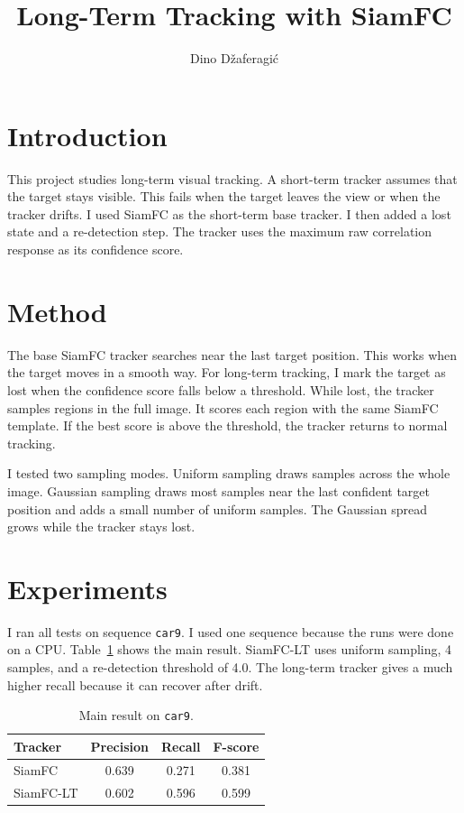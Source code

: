\documentclass[9pt]{IEEEtran}
\title{\vspace{0ex}
Long-Term Tracking with SiamFC}
\author{Dino Džaferagić\vspace{-4.0ex}}
\begin{document}
\maketitle

\section{Introduction}

This project studies long-term visual tracking. A short-term tracker assumes that the target stays visible. This fails when the target leaves the view or when the tracker drifts. I used SiamFC as the short-term base tracker. I then added a lost state and a re-detection step. The tracker uses the maximum raw correlation response as its confidence score.

\section{Method}

The base SiamFC tracker searches near the last target position. This works when the target moves in a smooth way. For long-term tracking, I mark the target as lost when the confidence score falls below a threshold. While lost, the tracker samples regions in the full image. It scores each region with the same SiamFC template. If the best score is above the threshold, the tracker returns to normal tracking.

I tested two sampling modes. Uniform sampling draws samples across the whole image. Gaussian sampling draws most samples near the last confident target position and adds a small number of uniform samples. The Gaussian spread grows while the tracker stays lost.

\section{Experiments}

I ran all tests on sequence \texttt{car9}. I used one sequence because the runs were done on a CPU. Table~\ref{tab:main} shows the main result. SiamFC-LT uses uniform sampling, 4 samples, and a re-detection threshold of 4.0. The long-term tracker gives a much higher recall because it can recover after drift.

\begin{table}[h]
    \centering
    \caption{Main result on \texttt{car9}.}
    \label{tab:main}
    \scriptsize
    \begin{tabular}{lccc}
        \hline
        Tracker   & Precision & Recall & F-score \\
        \hline
        SiamFC    & 0.639     & 0.271  & 0.381   \\
        SiamFC-LT & 0.602     & 0.596  & 0.599   \\
        \hline
    \end{tabular}
\end{table}
\end{document}
